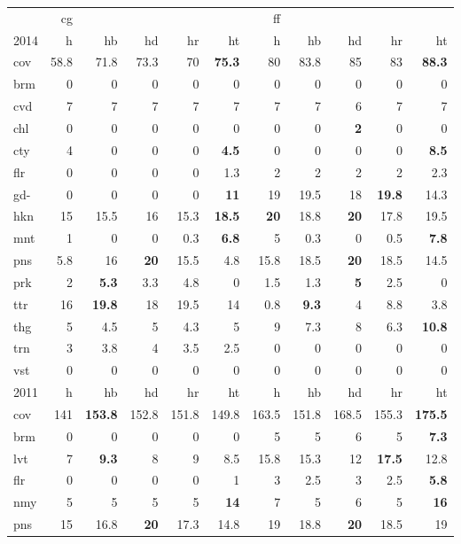 \begin{center}
\begin{tabular}{lrrrrrrrrrr}
 & cg &  &  &  &  & ff &  &  &  & \\
2014 & h & hb & hd & hr & ht & h & hb & hd & hr & ht\\
\hline
cov & 58.8 & 71.8 & 73.3 & 70 & \textbf{75.3} & 80 & 83.8 & 85 & 83 & \textbf{88.3}\\
brm & 0 & 0 & 0 & 0 & 0 & 0 & 0 & 0 & 0 & 0\\
cvd & 7 & 7 & 7 & 7 & 7 & 7 & 7 & 6 & 7 & 7\\
chl & 0 & 0 & 0 & 0 & 0 & 0 & 0 & \textbf{2} & 0 & 0\\
cty & 4 & 0 & 0 & 0 & \textbf{4.5} & 0 & 0 & 0 & 0 & \textbf{8.5}\\
flr & 0 & 0 & 0 & 0 & 1.3 & 2 & 2 & 2 & 2 & 2.3\\
gd- & 0 & 0 & 0 & 0 & \textbf{11} & 19 & 19.5 & 18 & \textbf{19.8} & 14.3\\
hkn & 15 & 15.5 & 16 & 15.3 & \textbf{18.5} & \textbf{20} & 18.8 & \textbf{20} & 17.8 & 19.5\\
mnt & 1 & 0 & 0 & 0.3 & \textbf{6.8} & 5 & 0.3 & 0 & 0.5 & \textbf{7.8}\\
pns & 5.8 & 16 & \textbf{20} & 15.5 & 4.8 & 15.8 & 18.5 & \textbf{20} & 18.5 & 14.5\\
prk & 2 & \textbf{5.3} & 3.3 & 4.8 & 0 & 1.5 & 1.3 & \textbf{5} & 2.5 & 0\\
ttr & 16 & \textbf{19.8} & 18 & 19.5 & 14 & 0.8 & \textbf{9.3} & 4 & 8.8 & 3.8\\
thg & 5 & 4.5 & 5 & 4.3 & 5 & 9 & 7.3 & 8 & 6.3 & \textbf{10.8}\\
trn & 3 & 3.8 & 4 & 3.5 & 2.5 & 0 & 0 & 0 & 0 & 0\\
vst & 0 & 0 & 0 & 0 & 0 & 0 & 0 & 0 & 0 & 0\\
\hline
2011 & h & hb & hd & hr & ht & h & hb & hd & hr & ht\\
\hline
cov & 141 & \textbf{153.8} & 152.8 & 151.8 & 149.8 & 163.5 & 151.8 & 168.5 & 155.3 & \textbf{175.5}\\
brm & 0 & 0 & 0 & 0 & 0 & 5 & 5 & 6 & 5 & \textbf{7.3}\\
lvt & 7 & \textbf{9.3} & 8 & 9 & 8.5 & 15.8 & 15.3 & 12 & \textbf{17.5} & 12.8\\
flr & 0 & 0 & 0 & 0 & 1 & 3 & 2.5 & 3 & 2.5 & \textbf{5.8}\\
nmy & 5 & 5 & 5 & 5 & \textbf{14} & 7 & 5 & 6 & 5 & \textbf{16}\\
pns & 15 & 16.8 & \textbf{20} & 17.3 & 14.8 & 19 & 18.8 & \textbf{20} & 18.5 & 19\\

\end{tabular}
\end{center}
